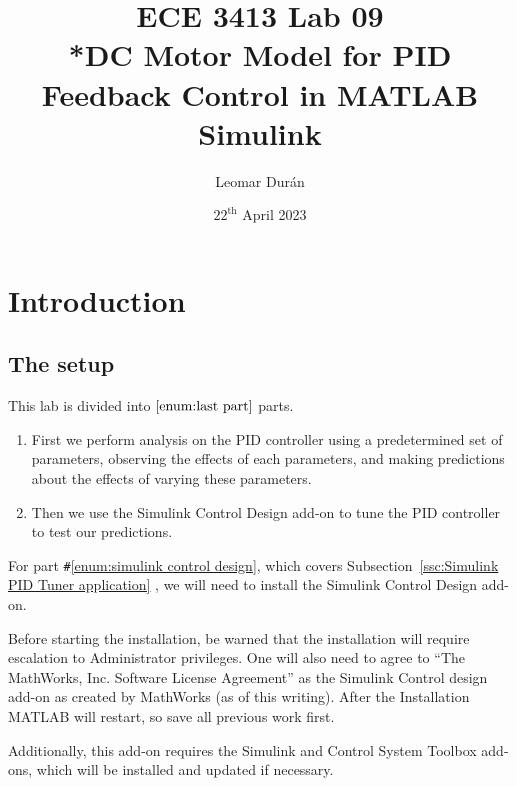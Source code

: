 \documentclass[12pt]{article}
\title{ECE 3413 Lab 09\\*DC Motor Model for PID Feedback Control in MATLAB Simulink}
\author{Leomar Dur\'an}
\date{${22}^{\text{th}}$ April 2023}
\begin{document}
\maketitle
\newpage

\section{Introduction}\label{sec:intro}

\subsection{The setup}\label{ssc:the setup}

This lab is divided into $\ref{enum:last part}$ parts.
\begin{enumerate}
    \item
        First we perform analysis on the PID controller using a predetermined set of parameters,
        observing the effects of each parameters,
        and making predictions about the effects of varying these parameters.
    \item\label{enum:simulink control design}
        Then we use the Simulink Control Design add-on to tune the PID controller to test our predictions.
    \label{enum:last part}
\end{enumerate}

For part \verb|#|\ref{enum:simulink control design},
which covers Subsection~\ref{ssc:Simulink PID Tuner application} ,
we will need to install the Simulink Control Design add-on.

Before starting the installation,
be warned that the installation will require escalation to Administrator privileges.
One will also need to agree to ``The MathWorks, Inc. Software License Agreement''
as the Simulink Control design add-on as created by MathWorks%
{} (as of this writing).
After the Installation MATLAB will restart,
so save all previous work first.

Additionally,
this add-on requires the Simulink and Control System Toolbox add-ons,
which will be installed and updated if necessary.
\end{document}

